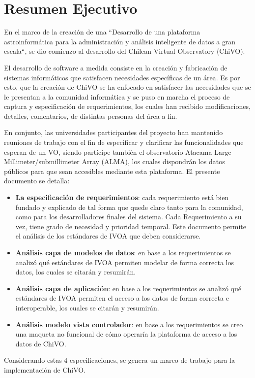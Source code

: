 \section{Resumen Ejecutivo}

En el marco de la creación de una ``Desarrollo de una plataforma
astroinformática para la administración y análisis inteligente de datos a gran
escala``, se dio comienzo al desarrollo del Chilean Virtual Observatory (ChiVO).

El desarrollo de software a medida consiste en la creación y fabricación de
sistemas informáticos que satisfacen necesidades específicas de un área. Es por
esto, que la creación de ChiVO se ha enfocado en satisfacer las necesidades que
se le presentan a la comunidad informática y se puso en marcha el proceso de
captura y especificación de requerimientos, los cuales han recibido
modificaciones, detalles, comentarios, de distintas personas del área a fin.

En conjunto, las universidades participantes del proyecto han mantenido
reuniones de trabajo con el fin de especificar y clarificar las funcionalidades
que esperan de un VO, siendo partícipe también el observatorio Atacama Large
Millimeter/submillimeter Array (ALMA), los cuales dispondrán los datos públicos
para que sean accesibles mediante esta plataforma. El presente documento se
detalla:
\begin{itemize}
	\item \textbf{La especificación de requerimientos}: cada requerimiento está bien
fundado y explicado de tal forma que quede claro tanto para la comunidad, como
para los desarrolladores finales del sistema. Cada Requerimiento a su vez,
tiene grado de necesidad y prioridad temporal. Este documento permite el
análisis de los estándares de IVOA que deben considerarse.
	\item \textbf{Análisis capa de modelos de datos}: en base a los requerimientos
se analizó qué estándares de IVOA permiten modelar de forma correcta los datos,
los cuales se citarán y resumirán.
	\item \textbf{Análisis capa de aplicación}: en base a los requerimientos se
analizó qué estándares de IVOA permiten el acceso a los datos de forma correcta
e interoperable, los cuales se citarán y resumirán.
	\item \textbf{Análisis modelo vista controlador}: en base a los requerimientos
se creo una maqueta no funcional de cómo operaría la plataforma de acceso a los
datos de ChiVO.
\end{itemize}

Considerando estas 4 especificaciones, se genera un marco de trabajo para la implementación de ChiVO.
